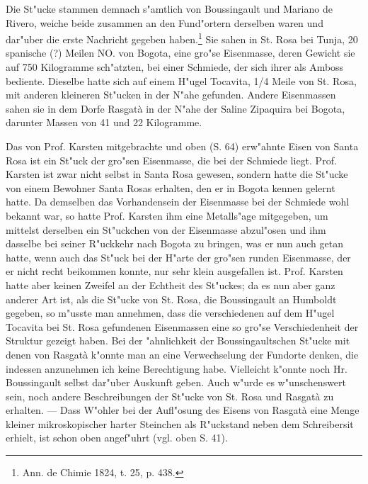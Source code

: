 \documentclass[a4paper, 11pt, oneside, german]{article}
\begin{document}
Die St"ucke stammen demnach s"amtlich von Boussingault und Mariano de Rivero, weiche beide zusammen an den Fund"ortern derselben waren und dar"uber die erste Nachricht gegeben haben.\footnote{Ann. de Chimie 1824, t. 25, p. 438.} Sie sahen in St. Rosa bei Tunja, 20 spanische (?) Meilen NO. von Bogota, eine gro"se Eisenmasse, deren Gewicht sie auf 750 Kilogramme sch"atzten, bei einer Schmiede, der sich ihrer als Amboss bediente. Dieselbe hatte sich auf einem H"ugel Tocavita, 1/4 Meile von St. Rosa, mit anderen kleineren St"ucken in der N"ahe gefunden. Andere Eisenmassen sahen sie in dem Dorfe Rasgatà in der N"ahe der Saline Zipaquira bei Bogota, darunter Massen von 41 und 22 Kilogramme.

Das von Prof. Karsten mitgebrachte und oben (S. 64) erw"ahnte Eisen von Santa Rosa ist ein St"uck der gro"sen Eisenmasse, die bei der Schmiede liegt. Prof. Karsten ist zwar nicht selbst in Santa Rosa gewesen, sondern hatte die St"ucke von einem Bewohner Santa Rosas erhalten, den er in Bogota kennen gelernt hatte. Da demselben das Vorhandensein der Eisenmasse bei der Schmiede wohl bekannt war, so hatte Prof. Karsten ihm eine Metalls"age mitgegeben, um mittelst derselben ein St"uckchen von der Eisenmasse abzul"osen und ihm dasselbe bei seiner R"uckkehr nach Bogota zu bringen, was er nun auch getan hatte, wenn auch das St"uck bei der H"arte der gro"sen runden Eisenmasse, der er nicht recht beikommen konnte, nur sehr klein ausgefallen ist. Prof. Karsten hatte aber keinen Zweifel an der Echtheit des St"uckes; da es nun aber ganz anderer Art ist, als die St"ucke von St. Rosa, die Boussingault an Humboldt gegeben, so m"usste man annehmen, dass die verschiedenen auf dem H"ugel Tocavita bei St. Rosa gefundenen Eisenmassen eine so gro"se Verschiedenheit der Struktur gezeigt haben. Bei der "ahnlichkeit der Boussingaultschen St"ucke mit denen von Rasgatà k"onnte man an eine Verwechselung der Fundorte denken, die indessen anzunehmen ich keine Berechtigung habe. Vielleicht k"onnte noch Hr. Boussingault selbst dar"uber Auskunft geben. Auch w"urde es w"unschenswert sein, noch andere Beschreibungen der St"ucke von St. Rosa und Rasgatà zu erhalten. --- Dass W"ohler bei der Aufl"osung des Eisens von Rasgatà eine Menge kleiner mikroskopischer harter Steinchen als R"uckstand neben dem Schreibersit erhielt, ist schon oben angef"uhrt (vgl. oben S. 41).
\end{document}
